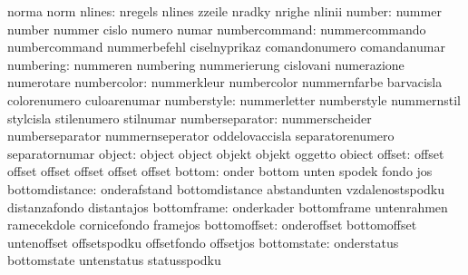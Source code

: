                            norma                     norm
                   nlines: nregels                   nlines
                           zzeile                    nradky
                           nrighe                    nlinii
                   number: nummer                    number
                           nummer                    cislo
                           numero                    numar
            numbercommand: nummercommando            numbercommand
                           nummerbefehl              ciselnyprikaz
                           comandonumero             comandanumar
                numbering: nummeren                  numbering
                           nummerierung              cislovani
                           numerazione               numerotare
              numbercolor: nummerkleur               numbercolor
                           nummernfarbe              barvacisla
                           colorenumero              culoarenumar
              numberstyle: nummerletter              numberstyle
                           nummernstil               stylcisla
                           stilenumero               stilnumar
          numberseparator: nummerscheider            numberseparator
                           nummernseperator          oddelovaccisla
                           separatorenumero          separatornumar
                   object: object                    object
                           objekt                    objekt
                           oggetto                   obiect
                   offset: offset                    offset
                           offset                    offset
                           offset                    offset
                   bottom: onder                     bottom
                           unten                     spodek
                           fondo                     jos
           bottomdistance: onderafstand              bottomdistance
                           abstandunten              vzdalenostspodku
                           distanzafondo             distantajos
              bottomframe: onderkader                bottomframe
                           untenrahmen               ramecekdole
                           cornicefondo              framejos
             bottomoffset: onderoffset               bottomoffset
                           untenoffset               offsetspodku
                           offsetfondo               offsetjos
              bottomstate: onderstatus               bottomstate
                           untenstatus               statusspodku
